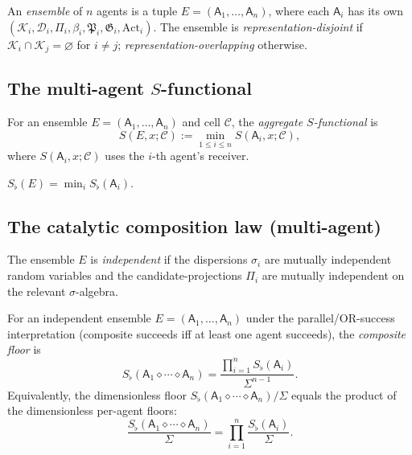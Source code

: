 \documentclass[11pt,a4paper]{article}
\newcommand{\K}{\mathcal{K}}
\newcommand{\D}{\mathcal{D}}
\newcommand{\Cell}{\mathcal{C}}
\newcommand{\Method}{\mathfrak{P}}
\newcommand{\Goal}{\mathfrak{G}}
\newcommand{\agent}{\mathsf{A}}
\newcommand{\Sfloor}{S_{\flat}}
\newcommand{\Action}{\mathrm{Act}}
\newcommand{\Compose}{\diamond}
\begin{document}
\begin{definition}\label{def:ensemble}
An \emph{ensemble} of $n$ agents is a tuple
$E=(\agent_1,\dots,\agent_n)$, where each $\agent_i$ has its own
$(\K_i,\D_i,\Pi_i,\beta_i,\Method_i,\Goal_i,\Action_i)$. The ensemble
is \emph{representation-disjoint} if $\K_i\cap\K_j=\varnothing$ for
$i\ne j$; \emph{representation-overlapping} otherwise.
\end{definition}

\subsection{The multi-agent $S$-functional}

\begin{definition}\label{def:multi-S}
For an ensemble $E=(\agent_1,\dots,\agent_n)$ and cell $\Cell$, the
\emph{aggregate $S$-functional} is
\[
S(E,x;\Cell):=\min_{1\le i\le n}S(\agent_i,x;\Cell),
\]
where $S(\agent_i,x;\Cell)$ uses the $i$-th agent's receiver.
\end{definition}

\begin{proposition}\label{prop:agg-floor}
$\Sfloor(E)=\min_i\Sfloor(\agent_i)$.
\end{proposition}

\subsection{The catalytic composition law (multi-agent)}

\begin{definition}\label{def:indep}
The ensemble $E$ is \emph{independent} if the dispersions
$\sigma_i$ are mutually independent random variables and the
candidate-projections $\Pi_i$ are mutually independent on the relevant
$\sigma$-algebra.
\end{definition}

\begin{theorem}\label{thm:multi-cat}
For an independent ensemble $E=(\agent_1,\dots,\agent_n)$ under the
parallel/OR-success interpretation (composite succeeds iff at least
one agent succeeds), the \emph{composite floor} is
\[
\Sfloor(\agent_1\Compose\cdots\Compose\agent_n)
=\frac{\prod_{i=1}^n\Sfloor(\agent_i)}{\Sigma^{n-1}}.
\]
Equivalently, the dimensionless floor
$\Sfloor(\agent_1\Compose\cdots\Compose\agent_n)/\Sigma$ equals the
product of the dimensionless per-agent floors:
\[
\frac{\Sfloor(\agent_1\Compose\cdots\Compose\agent_n)}{\Sigma}
=\prod_{i=1}^n\frac{\Sfloor(\agent_i)}{\Sigma}.
\]
\end{theorem}
\end{document}

